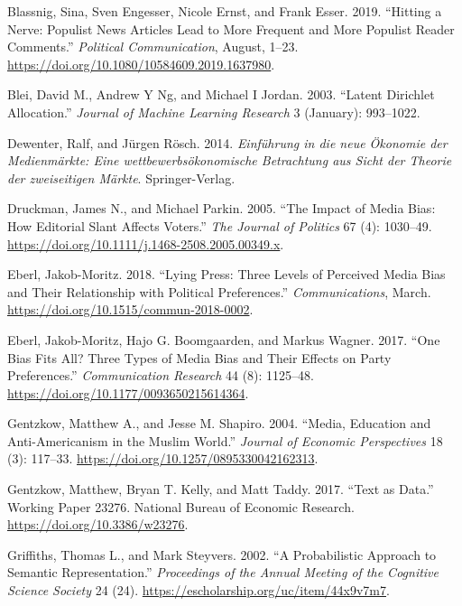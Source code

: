 \documentclass[
]{article}
\begin{document}
\leavevmode\hypertarget{ref-blassnig_hitting_2019}{}%
Blassnig, Sina, Sven Engesser, Nicole Ernst, and Frank Esser. 2019.
``Hitting a Nerve: Populist News Articles Lead to More Frequent and More
Populist Reader Comments.'' \emph{Political Communication}, August,
1--23. \url{https://doi.org/10.1080/10584609.2019.1637980}.

\leavevmode\hypertarget{ref-blei_latent_2003}{}%
Blei, David M., Andrew Y Ng, and Michael I Jordan. 2003. ``Latent
Dirichlet Allocation.'' \emph{Journal of Machine Learning Research} 3
(January): 993--1022.

\leavevmode\hypertarget{ref-dewenter_einfuhrung_2014}{}%
Dewenter, Ralf, and Jürgen Rösch. 2014. \emph{Einführung in die neue
Ökonomie der Medienmärkte: Eine wettbewerbsökonomische Betrachtung aus
Sicht der Theorie der zweiseitigen Märkte}. Springer-Verlag.

\leavevmode\hypertarget{ref-druckman_impact_2005}{}%
Druckman, James N., and Michael Parkin. 2005. ``The Impact of Media
Bias: How Editorial Slant Affects Voters.'' \emph{The Journal of
Politics} 67 (4): 1030--49.
\url{https://doi.org/10.1111/j.1468-2508.2005.00349.x}.

\leavevmode\hypertarget{ref-eberl_lying_2018}{}%
Eberl, Jakob-Moritz. 2018. ``Lying Press: Three Levels of Perceived
Media Bias and Their Relationship with Political Preferences.''
\emph{Communications}, March.
\url{https://doi.org/10.1515/commun-2018-0002}.

\leavevmode\hypertarget{ref-eberl_one_2017}{}%
Eberl, Jakob-Moritz, Hajo G. Boomgaarden, and Markus Wagner. 2017. ``One
Bias Fits All? Three Types of Media Bias and Their Effects on Party
Preferences.'' \emph{Communication Research} 44 (8): 1125--48.
\url{https://doi.org/10.1177/0093650215614364}.

\leavevmode\hypertarget{ref-gentzkow_media_2004}{}%
Gentzkow, Matthew A., and Jesse M. Shapiro. 2004. ``Media, Education and
Anti-Americanism in the Muslim World.'' \emph{Journal of Economic
Perspectives} 18 (3): 117--33.
\url{https://doi.org/10.1257/0895330042162313}.

\leavevmode\hypertarget{ref-gentzkow_text_2017}{}%
Gentzkow, Matthew, Bryan T. Kelly, and Matt Taddy. 2017. ``Text as
Data.'' Working Paper 23276. National Bureau of Economic Research.
\url{https://doi.org/10.3386/w23276}.

\leavevmode\hypertarget{ref-griffiths_probabilistic_2002}{}%
Griffiths, Thomas L., and Mark Steyvers. 2002. ``A Probabilistic
Approach to Semantic Representation.'' \emph{Proceedings of the Annual
Meeting of the Cognitive Science Society} 24 (24).
\url{https://escholarship.org/uc/item/44x9v7m7}.
\end{document}
